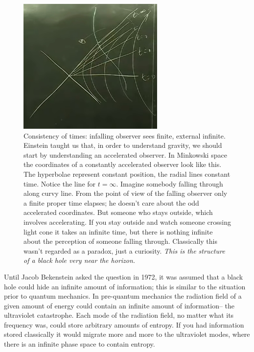 \documentclass[]{article}
\begin{document}
{\begin{appendices}
	\begin{figure}[H]
		\begin{center}
			\caption[Consistency of times: infalling observer sees finite, external infinite.]{Consistency of times: infalling observer sees finite, external infinite. Einstein taught us that, in order to understand gravity, we should start by understanding an accelerated observer. In Minkowski space the coordinates of a constantly accelerated observer look like this. The hyperbolae represent constant position, the radial lines constant time. Notice the line for $t=\infty$. Imagine somebody falling through along curvy line. From the point of view of the falling observer only a finite proper time elapses; he doesn't care about the odd accelerated coordinates. But someone who stays outside, which involves accelerating. If you stay outside and watch someone crossing light cone it takes an infinite time, but there is nothing infinite about the perception of someone falling through. Classically this wasn't regarded as a paradox, just a curiosity. \emph{This is the structure of a black hole very near the horizon.} }\label{fig:ibh-minkowski}
			\includegraphics{ibh-minkowski}
		\end{center}
	\end{figure}

	Until Jacob Bekenstein\cite{wiki:jacob:bekenstein} asked the question in 1972, it was assumed that a black hole could hide an infinite amount of information; this is similar to the situation prior to quantum mechanics. In pre-quantum mechanics the radiation field of a given amount of energy could contain an infinite amount of information-- the ultraviolet catastrophe. Each mode of the radiation field, no matter what its frequency was, could store arbitrary amounts of entropy. If you had information stored classically it would migrate more and more to the ultraviolet modes, where there is an infinite phase space to contain entropy. 
	

\end{appendices}}
\end{document}
